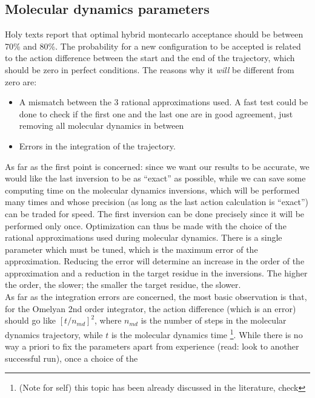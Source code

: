 \subsection{Molecular dynamics parameters}
Holy texts report that optimal hybrid montecarlo acceptance should be between 70\% and 80\%. 
The probability for a new configuration to be accepted is related to the action 
difference between the start and the end of the trajectory, which should be zero 
in perfect conditions. The reasons why it \emph{will} be different from zero are:
\begin{itemize}
    \item A mismatch between the 3 rational approximations used. A fast test could 
        be done to check if the first one and the last one are in good agreement, just removing all molecular dynamics in between
    \item Errors in the integration of the trajectory.
\end{itemize}
As far as the first point is concerned: since we want our results to be 
accurate, we would like the last inversion to be as 
``exact'' as possible, while we can save some computing time on the molecular dynamics 
inversions, which will be performed many times and whose precision (as long as the last 
action calculation is ``exact'') can be traded for speed. The first inversion can be 
done precisely since it will be performed only once. Optimization can thus be made with
the choice of the rational approximations used during molecular dynamics. There is a 
single parameter which must be tuned, which is the maximum error of the approximation. 
Reducing the error will determine an increase in the order of the approximation and a 
reduction in the target residue in the inversions. The higher the order, the slower; 
the smaller the target residue, the slower. \\
As far as the integration errors are concerned, the most basic observation is that, for 
the Omelyan 2nd order integrator, the action difference (which is an error) should go 
like $[t/n_{md}]^2$, where $n_{md}$ is the number of steps in the molecular dynamics 
trajectory, while $t$ is the molecular dynamics time
\footnote{(Note for self) 
this topic has been already discussed in the literature, check}. 
While there is no way a priori to fix the parameters apart from 
experience (read: look to another successful run), once a choice of the 
